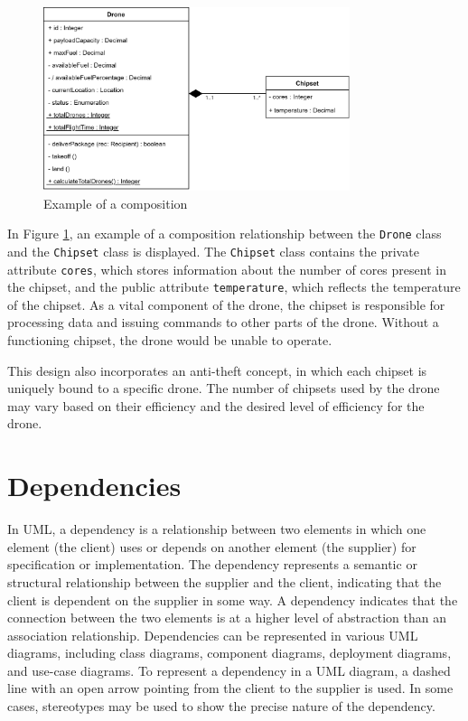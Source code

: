 \documentclass[
	12pt,
    a4paper,
    egregdoesnotlikesansseriftitles, %
    toc=chapterentrywithdots,
    oneside, openany,
    titlepage,
    parskip=half,
    headings=normal,  %
    listof=totoc,
    bibliography=totoc,
    index=totoc,
    captions=tableheading,  %
    listof=flat,
    numbers=noenddot, %
    final]
    {scrbook}
\begin{document}
\begin{figure}[h]
\centering
\includegraphics[width=0.8\textwidth]{figures/aggr_comp/comp.jpg}
\caption[Example composition]{Example of a composition}
\label{fig:composition_example}
\end{figure}


In Figure \ref{fig:composition_example}, an example of a composition relationship between the \texttt{Drone} class and the \texttt{Chipset} class is displayed. The \texttt{Chipset} class contains the private attribute \texttt{cores}, which stores information about the number of cores present in the chipset, and the public attribute \texttt{temperature}, which reflects the temperature of the chipset. As a vital component of the drone, the chipset is responsible for processing data and issuing commands to other parts of the drone. Without a functioning chipset, the drone would be unable to operate.

This design also incorporates an anti-theft concept, in which each chipset is uniquely bound to a specific drone. The number of chipsets used by the drone may vary based on their efficiency and the desired level of efficiency for the drone.


\chapter{Dependencies}

In UML, a dependency is a relationship between two elements in which one element (the client) uses or depends on another element (the supplier) for specification or implementation.
The dependency represents a semantic or structural relationship between the supplier and the client, indicating that the client is dependent on the supplier in some way.
A dependency indicates that the connection between the two elements is at a higher level of abstraction than an association relationship.
Dependencies can be represented in various UML diagrams, including class diagrams, component diagrams, deployment diagrams, and use-case diagrams. 
To represent a dependency in a UML diagram, a dashed line with an open arrow pointing from the client to the supplier is used. 
In some cases, stereotypes may be used to show the precise nature of the dependency. \cite[p. 159-160]{uml}
\end{document}
